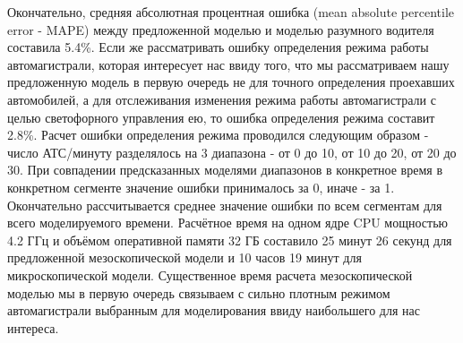 Окончательно, средняя абсолютная процентная ошибка (mean absolute percentile error - MAPE) между предложенной моделью и моделью разумного водителя составила 5.4\%.
Если же рассматривать ошибку определения режима работы автомагистрали, которая интересует нас ввиду того, что мы рассматриваем нашу предложенную модель в первую очередь не для точного определения проехавших автомобилей, а для отслеживания изменения режима работы автомагистрали с целью светофорного управления ею, то ошибка определения режима составит 2.8\%.
Расчет ошибки определения режима проводился следующим образом - число АТС/минуту разделялось на 3 диапазона - от 0 до 10, от 10 до 20, от 20 до 30.
При совпадении предсказанных моделями диапазонов в конкретное время в конкретном сегменте значение ошибки принималось за 0, иначе - за 1.
Окончательно рассчитывается среднее значение ошибки по всем сегментам для всего моделируемого времени.
Расчётное время на одном ядре CPU мощностью 4.2 ГГц и объёмом оперативной памяти 32 ГБ составило 25 минут 26 секунд для предложенной мезоскопической модели и 10 часов 19 минут для микроскопической модели.
Существенное время расчета мезоскопической моделью мы в первую очередь связываем с сильно плотным режимом автомагистрали выбранным для моделирования ввиду наибольшего для нас интереса.

